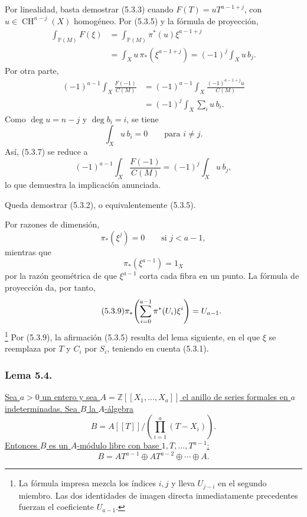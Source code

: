 Por linealidad, basta demostrar (5.3.3) cuando
$F(T)=uT^{a-1+j}$, con $u\in\operatorname{CH}^{n-j}(X)$ homogéneo.
Por (5.3.5) y la fórmula de proyección,
\begin{equation}\tag{5.3.6}
\begin{aligned}
\int_{\mathbb P(M)}F(\xi)
&=\int_{\mathbb P(M)}\pi^*(u)\xi^{a-1+j}\\
&=\int_Xu\,\pi_*(\xi^{a-1+j})
=(-1)^j\int_Xu\,b_j.
\end{aligned}
\end{equation}
Por otra parte,
\begin{equation}\tag{5.3.7}
\begin{aligned}
(-1)^{a-1}\int_X\frac{F(-1)}{C(M)}
&=(-1)^{a-1}\int_X
  \frac{(-1)^{a-1+j}u}{C(M)}\\
&=(-1)^j\int_X\sum_i u\,b_i.
\end{aligned}
\end{equation}
Como $\deg u=n-j$ y $\deg b_i=i$, se tiene
\[
\int_Xu\,b_i=0\qquad\text{para }i\ne j.
\]
Así, (5.3.7) se reduce a
\begin{equation}\tag{5.3.8}
(-1)^{a-1}\int_X\frac{F(-1)}{C(M)}
=(-1)^j\int_Xu\,b_j,
\end{equation}
lo que demuestra la implicación anunciada.

Queda demostrar (5.3.2), o equivalentemente (5.3.5).

\pageoriginale

Por razones de dimensión,
\[
\pi_*(\xi^j)=0\qquad\text{si }j<a-1,
\]
mientras que
\[
\pi_*(\xi^{a-1})=1_X
\]
por la razón geométrica de que $\xi^{a-1}$ corta cada fibra en un
punto. La fórmula de proyección da, por tanto,
\begin{equation}\tag{5.3.9}
\sisi{\displaystyle
\pi_*\!\left(\sum_{j=0}^{a-1}\pi^*(U_i)\xi^i\right)=U_{j-i}}
{\displaystyle
\pi_*\!\left(\sum_{i=0}^{a-1}\pi^*(U_i)\xi^i\right)=U_{a-1}}.
\end{equation}
\footnote{La fórmula impresa mezcla los índices $i,j$ y lleva
$U_{j-i}$ en el segundo miembro. Las dos identidades de imagen directa
inmediatamente precedentes fuerzan el coeficiente $U_{a-1}$.}
Por (5.3.9), la afirmación (5.3.5) resulta del lema siguiente, en el
que $\xi$ se reemplaza por $T$ y $C_i$ por $S_i$, teniendo en cuenta
(5.3.1).

\subsubsection*{Lema 5.4.}
\underline{Sea }$a>0$\underline{ un entero y sea
$A=\mathbb Z[[X_1,\ldots,X_a]]$ el anillo de series formales en $a$
indeterminadas. Sea $B$ la $A$-álgebra}
\[
B=A[[T]]\bigg/\left(\prod_{i=1}^{a}(T-X_i)\right).
\]
\underline{Entonces $B$ es un $A$-módulo libre con base
$1,T,\ldots,T^{a-1}$:}
\begin{equation}\tag{5.4.1}
B=AT^{a-1}\oplus AT^{a-2}\oplus\cdots\oplus A.
\end{equation}

